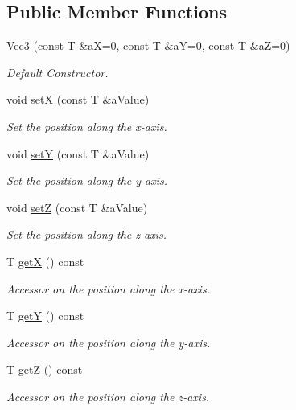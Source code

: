 \subsection*{Public Member Functions}
\begin{DoxyCompactItemize}
\item 
\hyperlink{class_math_1_1_vec3_aecaea0693c6d31b1df4f4d2d75beb868}{Vec3} (const T \&aX=0, const T \&aY=0, const T \&aZ=0)
\begin{DoxyCompactList}\small\item\em Default Constructor. \end{DoxyCompactList}\item 
void \hyperlink{class_math_1_1_vec3_a5fc8f5b4eb732f0be26f7d90fc40488e}{setX} (const T \&aValue)
\begin{DoxyCompactList}\small\item\em Set the position along the x-\/axis. \end{DoxyCompactList}\item 
void \hyperlink{class_math_1_1_vec3_aa0aad7c28629148a5e9c587018f77dea}{setY} (const T \&aValue)
\begin{DoxyCompactList}\small\item\em Set the position along the y-\/axis. \end{DoxyCompactList}\item 
void \hyperlink{class_math_1_1_vec3_a567e7b6e9cd6bdf618b809c39f8103ef}{setZ} (const T \&aValue)
\begin{DoxyCompactList}\small\item\em Set the position along the z-\/axis. \end{DoxyCompactList}\item 
T \hyperlink{class_math_1_1_vec3_a0e6a0ae44f04152b422347026a0fd1de}{getX} () const 
\begin{DoxyCompactList}\small\item\em Accessor on the position along the x-\/axis. \end{DoxyCompactList}\item 
T \hyperlink{class_math_1_1_vec3_a80aed59b26dc66cc526a8b90d60243d3}{getY} () const 
\begin{DoxyCompactList}\small\item\em Accessor on the position along the y-\/axis. \end{DoxyCompactList}\item 
T \hyperlink{class_math_1_1_vec3_a644d7ca5de8c43849d192a47aebc1def}{getZ} () const 
\begin{DoxyCompactList}\small\item\em Accessor on the position along the z-\/axis. \end{DoxyCompactList}\item 

\end{DoxyCompactItemize}
